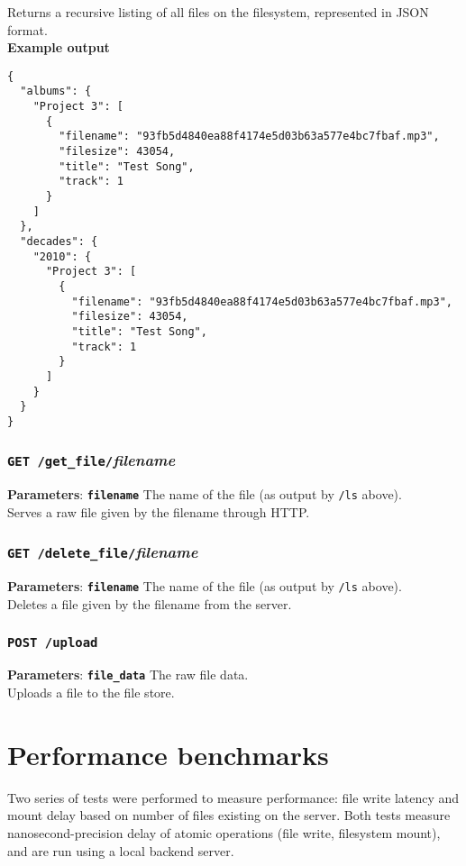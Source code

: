 \documentclass{article}
\begin{document}
	\noindent Returns a recursive listing of all files on the filesystem, represented in JSON format. \\

	\noindent\textbf{Example output}
\begin{lstlisting}
{
  "albums": {
    "Project 3": [
      {
        "filename": "93fb5d4840ea88f4174e5d03b63a577e4bc7fbaf.mp3",
        "filesize": 43054,
        "title": "Test Song",
        "track": 1
      }
    ]
  },
  "decades": {
    "2010": {
      "Project 3": [
        {
          "filename": "93fb5d4840ea88f4174e5d03b63a577e4bc7fbaf.mp3",
          "filesize": 43054,
          "title": "Test Song",
          "track": 1
        }
      ]
    }
  }
}
\end{lstlisting}
	
	\subsubsection{\texttt{GET /get\_file/}\textit{filename}}
	\textbf{Parameters}: \textbf{\texttt{filename}} The name of the file (as output by \texttt{/ls} above). \\
	
	\noindent Serves a raw file given by the filename through HTTP.
	
	\subsubsection{\texttt{GET /delete\_file/}\textit{filename}}
	\textbf{Parameters}: \textbf{\texttt{filename}} The name of the file (as output by \texttt{/ls} above). \\
	
	\noindent Deletes a file given by the filename from the server.
	
	\subsubsection{\texttt{POST /upload}}
	\textbf{Parameters}: \textbf{\texttt{file\_data}} The raw file data. \\
	
	\noindent Uploads a file to the file store.
	
	\section{Performance benchmarks} %
	Two series of tests were performed to measure performance: file write latency and mount delay based on number of files existing on the server. Both tests measure nanosecond-precision delay of atomic operations (file write, filesystem mount), and are run using a local backend server.
	
\end{document}
